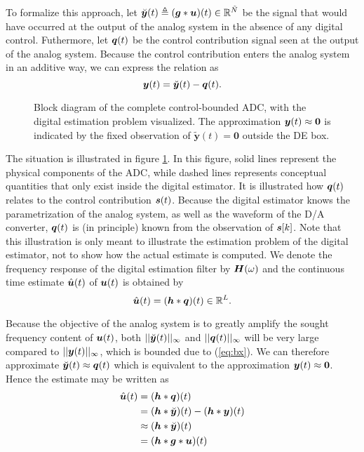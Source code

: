 To formalize this approach, let $\breve{\bm{y}}(t) \triangleq (\bm{g} * \bm{u})(t) \in \mathbb{R}^{\tilde{N}}$ be the signal that would have occurred at the output of the analog system in the absence of any digital control. Futhermore, let $\bm{q}(t)$ be the control contribution signal seen at the output of the analog system. Because the control contribution enters the analog system in an additive way, we can express the relation as
\begin{equation}
    \label{eq:actual_observation}
    \bm{y}(t) = \breve{\bm{y}}(t) -\bm{q}(t).
\end{equation}
\begin{sidewaysfigure}
    \centering
    
    \caption{Block diagram of the complete control-bounded ADC, with the digital estimation problem visualized. The approximation $\bm{y}(t) \approx \bm{0}$ is indicated by the fixed observation of $\tilde{\bm{y}}(t) = \bm{0}$ outside the DE box.}
    \label{fig:de_problem}
\end{sidewaysfigure}

The situation is illustrated in figure \ref{fig:de_problem}. In this figure, solid lines represent the physical components of the ADC, while dashed lines represents conceptual quantities that only exist inside the digital estimator. It is illustrated how $\bm{q}(t)$ relates to the control contribution $\bm{s}(t)$. Because the digital estimator knows the parametrization of the analog system, as well as the waveform of the D/A converter, $\bm{q}(t)$ is (in principle) known from the observation of $\bm{s}[k]$. Note that this illustration is only meant to illustrate the estimation problem of the digital estimator, not to show how the actual estimate is computed. We denote the frequency response of the digital estimation filter by $\bm{H}(\omega)$ and the continuous time estimate $\hat{\bm{u}}(t)$ of $\bm{u}(t)$ is obtained by
\begin{equation}
    \label{eq:uhat_conv_h_q}
    \hat{\bm{u}}(t) = (\bm{h} * \bm{q})(t) \in \mathbb{R}^{L}.
\end{equation}

Because the objective of the analog system is to greatly amplify the sought frequency content of $\bm{u}(t)$, both $||\breve{\bm{y}}(t)||_{\infty}$ and $||\bm{q}(t)||_{\infty}$ will be very large compared to $||\bm{y}(t)||_{\infty}$, which is bounded due to (\ref{eq:bx}). We can therefore approximate $\breve{\bm{y}}(t) \approx \bm{q}(t)$ which is equivalent to the approximation $\bm{y}(t) \approx \bm{0}$. Hence the estimate may be written as
\begin{align}
    \hat{\bm{u}}(t) &= (\bm{h} * \bm{q})(t) \\
            &= (\bm{h} * \breve{\bm{y}})(t) - (\bm{h} * \bm{y})(t) \label{eq:uhat_q_err}\\
            &\approx (\bm{h} * \breve{\bm{y}})(t) \label{eq:uhat_approx}\\
            &= (\bm{h} * \bm{g} * \bm{u})(t) \label{eq:uhat_q_err2}
\end{align}

